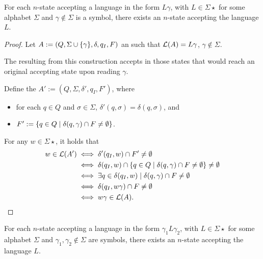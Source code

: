 \begin{thrm}
	For each $n$-state \NFA accepting a language in the form $L\gamma$, with $L\in\Sigma\star$ for some alphabet $\Sigma$ and $\gamma\notin\Sigma$ is a symbol, there exists an $n$-state \NFA accepting the language $L$.
\end{thrm}
\begin{proof}
	Let $A:=(Q,\Sigma\cup\{\gamma\},\delta,q_I,F)$ an \NFA such that $\mathcal L(A)=L\gamma$, $\gamma\notin\Sigma$.

	The \NFA resulting from this construction accepts in those states that would reach an original accepting state upon reading $\gamma$.

	Define the \NFA $A':=(Q,\Sigma,\delta',q_I,F')$, where
	\begin{itemize}
		\item for each $q\in Q$ and $\sigma\in\Sigma$, $\delta'(q,\sigma)=\delta(q,\sigma)$, and
		\item $F':=\{q\in Q\mid \delta(q,\gamma)\cap F\ne\emptyset\}$.
	\end{itemize}

	For any $w\in\Sigma\star$, it holds that
	\begin{align*}
		w\in\mathcal L(A') & \iff \delta'(q_I,w)\cap F'\ne\emptyset                                                 \\
		                 & \iff \delta(q_I,w)\cap \{q\in Q\mid \delta(q,\gamma)\cap F\ne\emptyset\}\ne\emptyset \\
		                 & \iff \exists q\in\delta(q_I,w)\mid \delta(q,\gamma)\cap F\ne\emptyset                  \\
		                 & \iff \delta(q_I,w\gamma)\cap F\ne\emptyset                                             \\
		                 & \iff w\gamma\in\mathcal L(A) \text. \qedhere
	\end{align*}
\end{proof}


\begin{coro}
	For each $n$-state \NFA accepting a language in the form $\gamma_1 L\gamma_2$, with $L\in\Sigma\star$ for some alphabet $\Sigma$ and $\gamma_1,\gamma_2\notin\Sigma$ are symbols, there exists an $n$-state \NFA accepting the language $L$.
\end{coro}



